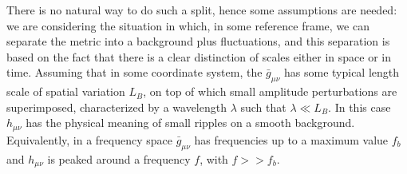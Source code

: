 \documentclass[binding=0.6cm, LaM]{sapthesis}
\begin{document}
There is no natural way to do such a split, hence some assumptions are needed: we are considering the situation in which, in some reference frame, we can separate the metric into a background plus fluctuations, and this separation is based on the fact that there is a clear distinction of scales either in space or in time.  
Assuming that in some coordinate system, the $\bar g_{\mu \nu}$ has some typical length scale of spatial variation $L_B$, on top of which small amplitude perturbations are superimposed, characterized by a wavelength $\lambda$ such that $\lambda \ll L_B$. In this case $h_{\mu\nu}$ has the physical meaning of small ripples on a smooth background. 
Equivalently, in a frequency space $\bar g_{\mu\nu}$ has frequencies up to a maximum value $f_b$ and  $h_{\mu\nu}$  is peaked around a frequency $f$, with $f >> f_b$.
\end{document}
